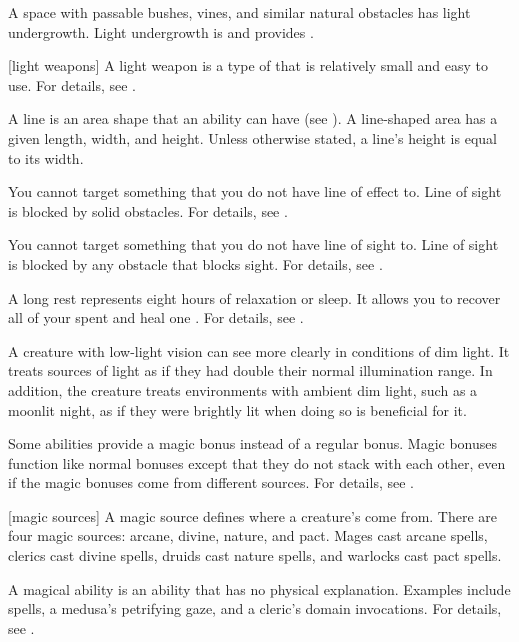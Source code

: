  A space with passable bushes, vines, and similar natural obstacles has light undergrowth.
Light undergrowth is  and provides .

[light weapons] A light weapon is a type of  that is relatively small and easy to use.
For details, see .

 A line is an area shape that an ability can have (see ).
A line-shaped area has a given length, width, and height.
Unless otherwise stated, a line's height is equal to its width.

 You cannot target something that you do not have line of effect to.
Line of sight is blocked by solid obstacles.
For details, see .

 You cannot target something that you do not have line of sight to.
Line of sight is blocked by any obstacle that blocks sight.
For details, see .

 A long rest represents eight hours of relaxation or sleep.
It allows you to recover all of your spent  and heal one .
For details, see .

 A creature with low-light vision can see more clearly in conditions of dim light.
It treats sources of light as if they had double their normal illumination range.
In addition, the creature treats environments with ambient dim light, such as a moonlit night, as if they were brightly lit when doing so is beneficial for it.

 Some abilities provide a magic bonus instead of a regular bonus.
Magic bonuses function like normal bonuses except that they do not stack with each other, even if the magic bonuses come from different sources.
For details, see .

[magic sources] A magic source defines where a creature's  come from.
There are four magic sources: arcane, divine, nature, and pact.
Mages cast arcane spells, clerics cast divine spells, druids cast nature spells, and warlocks cast pact spells.

 A magical ability is an ability that has no physical explanation.
Examples include spells, a medusa's petrifying gaze, and a cleric's domain invocations.
For details, see .

